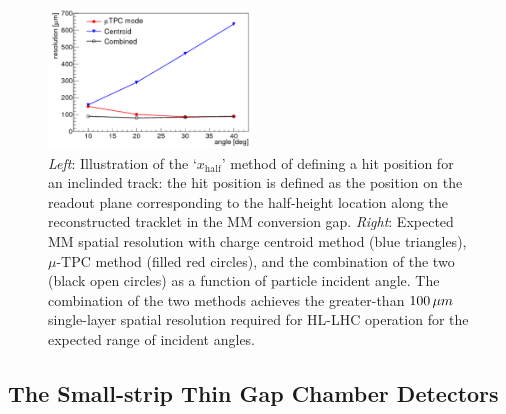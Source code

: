 \begin{figure}[!htb]
    \begin{center}
        \includegraphics[width=0.48\textwidth]{figures/nsw/tpc_vs_centroid_res}
        \caption{
            \textit{Left}: Illustration of the `$x_{\text{half}}$' method of defining a hit position for
                an inclinded track: the hit position is defined as the position on the readout plane
                corresponding to the half-height location along the reconstructed tracklet in the MM conversion gap.
            \textit{Right}: Expected MM spatial resolution with charge centroid method (blue triangles), $\mu$-TPC
                method (filled red circles), and the combination of the two (black open circles) as a function
                of particle incident angle.
                The combination of the two methods achieves the greater-than $100\,\mu m$ single-layer spatial resolution
                required for HL-LHC operation for the expected range of incident angles.
        }
        \label{fig:mm_tpc_hit_loc}
    \end{center}
\end{figure}

\subsection{The Small-strip Thin Gap Chamber Detectors}
\label{sec:nsw_stgc}
